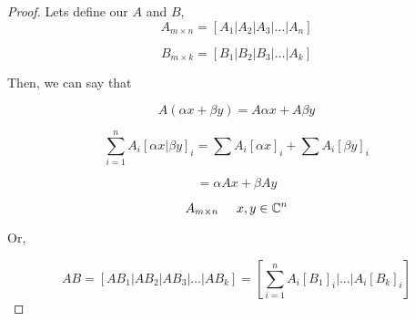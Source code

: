 \documentclass{exam}
\begin{document}
\begin{proof}
Lets define our \(A\) and \(B\),
\begin{equation}
  A_{m \times n} = [A_1 | A_2 | A_3 | \dots | A_n]
\end{equation}

\begin{equation}
  B_{m \times k} = [B_1 | B_2 | B_3 | \dots | A_k]
\end{equation}

Then, we can say that

\begin{equation}
  A(\alpha x + \beta y) = A\alpha x + A\beta y
\end{equation}

\begin{equation}
  \sum_{i=1}^{n} A_i [\alpha x | \beta y]_i = \sum A_i[\alpha x]_i + \sum A_i[\beta y]_i
\end{equation}

\begin{equation}
  = \alpha Ax + \beta Ay
\end{equation}

\[
A_{m \times n} \hspace{0.5cm}x,y \in\mathbb{C}^{n}
\]

Or,

\[
AB = \left[AB_1 | AB_2 | AB_3 | \dots | AB_k \right]
= \left[\sum_{i=1}^{n} A_i[B_1]_i | \dots | A_i[B_k]_i \right]
\]
\end{proof}
\end{document}
